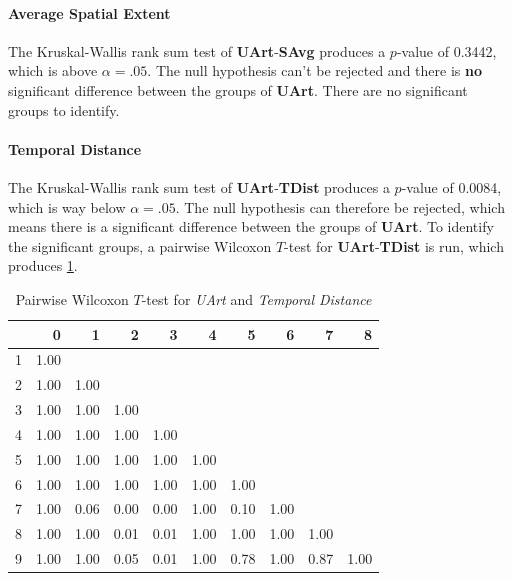 \paragraph{Average Spatial Extent}
The Kruskal-Wallis rank sum test of \textbf{UArt}-\textbf{SAvg} produces a $p$-value of 0.3442, which is above $\alpha=.05$. The null hypothesis can't be rejected and there is \textbf{no} significant difference between the groups of \textbf{UArt}. There are no significant groups to identify.

\paragraph{Temporal Distance}
The Kruskal-Wallis rank sum test of \textbf{UArt}-\textbf{TDist} produces a $p$-value of 0.0084, which is way below $\alpha=.05$. The null hypothesis can therefore be rejected, which means there is a significant difference between the groups of \textbf{UArt}. To identify the significant groups, a pairwise Wilcoxon $T$-test for \textbf{UArt}-\textbf{TDist} is run, which produces \cref{tbl:wilcoxon_baysis_initiator_UArt_TDist}. 
\begin{table}[ht]
	\small
	\centering
    \begin{tabular}{rrrrrrrrrr}
        \toprule
        & 0 & 1 & 2 & 3 & 4 & 5 & 6 & 7 & 8 \\ 
        \midrule
        1 & 1.00 &  &  &  &  &  &  &  &  \\ 
        2 & 1.00 & 1.00 &  &  &  &  &  &  &  \\ 
        3 & 1.00 & 1.00 & 1.00 &  &  &  &  &  &  \\ 
        4 & 1.00 & 1.00 & 1.00 & 1.00 &  &  &  &  &  \\ 
        5 & 1.00 & 1.00 & 1.00 & 1.00 & 1.00 &  &  &  &  \\ 
        6 & 1.00 & 1.00 & 1.00 & 1.00 & 1.00 & 1.00 &  &  &  \\ 
        7 & 1.00 & 0.06 & 0.00 & 0.00 & 1.00 & 0.10 & 1.00 &  &  \\ 
        8 & 1.00 & 1.00 & 0.01 & 0.01 & 1.00 & 1.00 & 1.00 & 1.00 &  \\ 
        9 & 1.00 & 1.00 & 0.05 & 0.01 & 1.00 & 0.78 & 1.00 & 0.87 & 1.00 \\ 
        \bottomrule
      \end{tabular}
    \caption{Pairwise Wilcoxon $T$-test for \textit{UArt} and \textit{Temporal Distance}}
    \label{tbl:wilcoxon_baysis_initiator_UArt_TDist}
\end{table}
